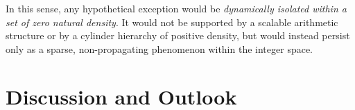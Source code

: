 \documentclass[12pt, oneside]{article}
\numberwithin{equation}{section}
\theoremstyle{definition}
\theoremstyle{plain}
\theoremstyle{remark}
\begin{document}
In this sense, any hypothetical exception would be \emph{dynamically isolated within
a set of zero natural density}.  It would not be supported by a scalable arithmetic
structure or by a cylinder hierarchy of positive density, but would instead persist
only as a sparse, non-propagating phenomenon within the integer space.

\section{Discussion and Outlook}


\clearpage


\end{document}
